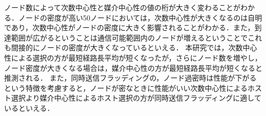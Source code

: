 ノード数によって次数中心性と媒介中心性の値の桁が大きく変わることがわかる．ノードの密度が高い50ノードにおいては，次数中心性が大きくなるのは自明であり，次数中心性がノードの密度に大きく影響されることがわかる．また，到達範囲が広がるということは通信可能範囲内のノードが増えるということでこれも間接的にノードの密度が大きくなっているといえる．
本研究では，次数中心性による選択の方が最短経路長平均が短くなったが，さらにノード数を増やし，ノード密度が大きくなる場合は，媒介中心性の方が最短経路長平均が短くなると推測される．
また，同時送信フラッディングの，ノード過密時は性能が下がるという特徴を考慮すると，ノードが密なときに性能がいい次数中心性によるホスト選択より媒介中心性によるホスト選択の方が同時送信フラッディングに適しているといえる．

